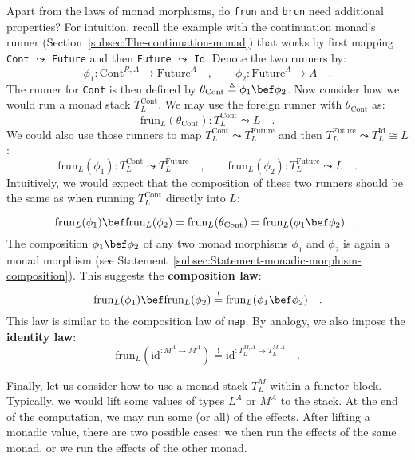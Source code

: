 Apart from the laws of monad morphisms, do \lstinline!frun! and \lstinline!brun!
need additional properties? For intuition, recall the example with
the continuation monad\textsf{'}s runner (Section~\ref{subsec:The-continuation-monad})
that works by first mapping \lstinline!Cont! $\leadsto$ \lstinline!Future!
and then \lstinline!Future! $\leadsto$ \lstinline!Id!. Denote the
two runners by:
\[
\phi_{1}:\text{Cont}^{R,A}\rightarrow\text{Future}^{A}\quad,\quad\quad\phi_{2}:\text{Future}^{A}\rightarrow A\quad.
\]
The runner for \lstinline!Cont! is then defined by $\theta_{\text{Cont}}\triangleq\phi_{1}\bef\phi_{2}$.
Now consider how we would run a monad stack $T_{L}^{\text{Cont}}$.
We may use the foreign runner with $\theta_{\text{Cont}}$ as:
\[
\text{frun}_{L}(\theta_{\text{Cont}}):T_{L}^{\text{Cont}}\leadsto L\quad.
\]
We could also use those runners to map $T_{L}^{\text{Cont}}\leadsto T_{L}^{\text{Future}}$
and then $T_{L}^{\text{Future}}\leadsto T_{L}^{\text{Id}}\cong L$:
\[
\text{frun}_{L}(\phi_{1}):T_{L}^{\text{Cont}}\leadsto T_{L}^{\text{Future}}\quad,\quad\quad\text{frun}_{L}(\phi_{2}):T_{L}^{\text{Future}}\leadsto L\quad.
\]
Intuitively, we would expect that the composition of these two runners
should be the same as when running $T_{L}^{\text{Cont}}$ directly
into $L$:
\[
\text{frun}_{L}(\phi_{1})\bef\text{frun}_{L}(\phi_{2})\overset{!}{=}\text{frun}_{L}(\theta_{\text{Cont}})=\text{frun}_{L}(\phi_{1}\bef\phi_{2})\quad.
\]
The composition $\phi_{1}\bef\phi_{2}$ of any two monad morphisms
$\phi_{1}$ and $\phi_{2}$ is again a monad morphism (see Statement~\ref{subsec:Statement-monadic-morphism-composition}).
This suggests the \textbf{composition law}:
\begin{equation}
\text{frun}_{L}(\phi_{1})\bef\text{frun}_{L}(\phi_{2})\overset{!}{=}\text{frun}_{L}(\phi_{1}\bef\phi_{2})\quad.\label{eq:composition-law-of-frun}
\end{equation}
This law is similar to the composition law of \lstinline!map!. By
analogy, we also impose the \textbf{identity law}:
\[
\text{frun}_{L}(\text{id}^{:M^{A}\rightarrow M^{A}})\overset{!}{=}\text{id}^{:T_{L}^{M,A}\rightarrow T_{L}^{M,A}}\quad.
\]

Finally, let us consider how to use a monad stack $T_{L}^{M}$ within
a functor block. Typically, we would lift some values of types $L^{A}$
or $M^{A}$ to the stack. At the end of the computation, we may run
some (or all) of the effects. After lifting a monadic value, there
are two possible cases: we then run the effects of the same monad,
or we run the effects of the other monad. 

